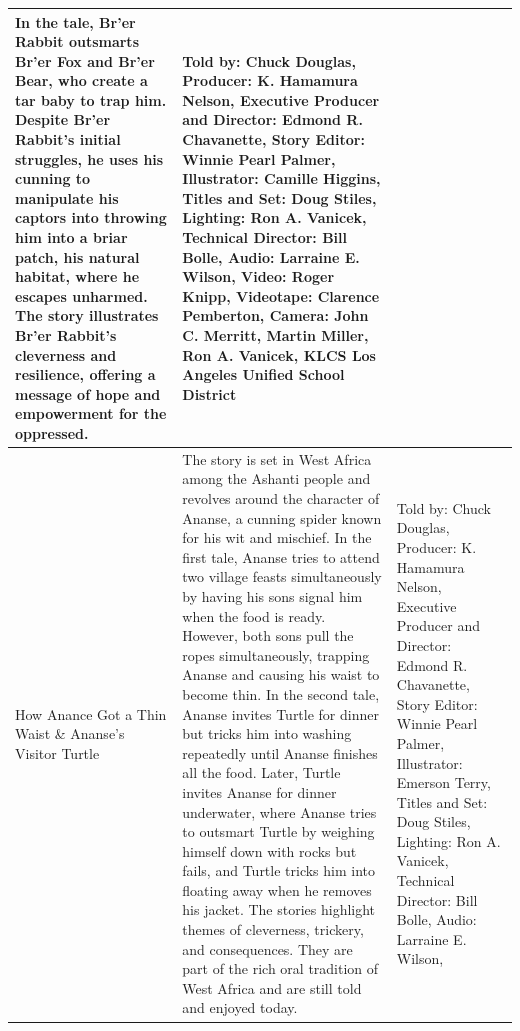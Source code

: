 \begin{table}[h]
\begin{small}
\begin{tabular}{|p{1.5cm}|p{8.5cm}|p{7cm}|}
            In the tale, Br'er Rabbit outsmarts Br'er Fox and Br'er Bear, who create a tar baby to trap him.
            Despite Br'er Rabbit's initial struggles, he uses his cunning to manipulate his captors into throwing him into a briar patch, his natural habitat, where he escapes unharmed.
            The story illustrates Br'er Rabbit's cleverness and resilience, offering a message of hope and empowerment for the oppressed.
                                 &
            Told by: Chuck Douglas,
            Producer: K. Hamamura Nelson,
            Executive Producer and Director: Edmond R. Chavanette,
            Story Editor: Winnie Pearl Palmer,
            Illustrator: Camille Higgins,
            Titles and Set: Doug Stiles,
            Lighting: Ron A. Vanicek,
            Technical Director: Bill Bolle,
            Audio: Larraine E. Wilson,
            Video: Roger Knipp,
            Videotape: Clarence Pemberton,
            Camera: John C. Merritt, Martin Miller, Ron A. Vanicek,
            KLCS Los Angeles Unified School District
            \\
            \hline
            How Anance Got a Thin Waist \& Ananse's Visitor Turtle
                                 &
            The story is set in West Africa among the Ashanti people and revolves around the character of Ananse, a cunning spider known for his wit and mischief.
            In the first tale, Ananse tries to attend two village feasts simultaneously by having his sons signal him when the food is ready.
            However, both sons pull the ropes simultaneously, trapping Ananse and causing his waist to become thin.
            In the second tale, Ananse invites Turtle for dinner but tricks him into washing repeatedly until Ananse finishes all the food.
            Later, Turtle invites Ananse for dinner underwater, where Ananse tries to outsmart Turtle by weighing himself down with rocks but fails, and Turtle tricks him into floating away when he removes his jacket.
            The stories highlight themes of cleverness, trickery, and consequences.
            They are part of the rich oral tradition of West Africa and are still told and enjoyed today.
                                 &
            Told by: Chuck Douglas,
            Producer: K. Hamamura Nelson,
            Executive Producer and Director: Edmond R. Chavanette,
            Story Editor: Winnie Pearl Palmer,
            Illustrator: Emerson Terry,
            Titles and Set: Doug Stiles,
            Lighting: Ron A. Vanicek,
            Technical Director: Bill Bolle,
            Audio: Larraine E. Wilson,

\end{tabular}
\end{small}
\end{table}
